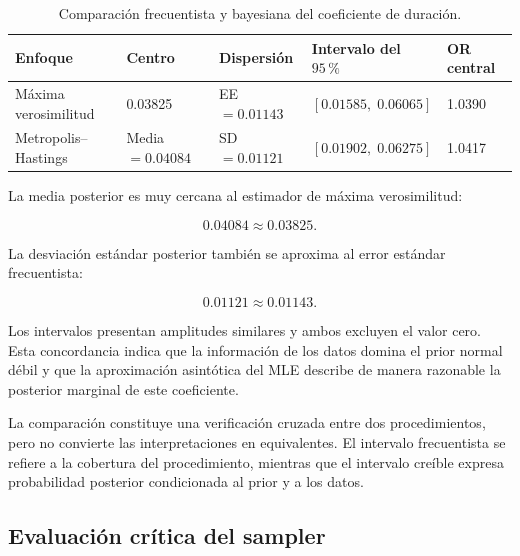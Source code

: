 \begin{table}[H]
    \centering
    \caption{Comparación frecuentista y bayesiana del coeficiente de
    duración.}
    \label{tab:comparacion-beta-duracion}

    \begin{tabularx}{0.94\textwidth}{
        @{}
        >{\raggedright\arraybackslash}p{3.3cm}
        >{\centering\arraybackslash}p{2.2cm}
        >{\centering\arraybackslash}p{2.2cm}
        >{\centering\arraybackslash}p{2.8cm}
        X
        @{}
    }
        \toprule
        Enfoque
        & Centro
        & Dispersión
        & Intervalo del \(95\,\%\)
        & OR central \\
        \midrule

        Máxima verosimilitud
        & \num{0.03825}
        & EE \(=\num{0.01143}\)
        & \([0.01585,\;0.06065]\)
        & \num{1.0390} \\

        Metropolis--Hastings
        & Media \(=\num{0.04084}\)
        & SD \(=\num{0.01121}\)
        & \([0.01902,\;0.06275]\)
        & \num{1.0417} \\

        \bottomrule
    \end{tabularx}
\end{table}

La media posterior es muy cercana al estimador de máxima verosimilitud:

\[
0.04084
\approx
0.03825.
\]

La desviación estándar posterior también se aproxima al error estándar
frecuentista:

\[
0.01121
\approx
0.01143.
\]

Los intervalos presentan amplitudes similares y ambos excluyen el valor
cero. Esta concordancia indica que la información de los datos domina el
prior normal débil y que la aproximación asintótica del MLE describe de
manera razonable la posterior marginal de este coeficiente.

La comparación constituye una verificación cruzada entre dos
procedimientos, pero no convierte las interpretaciones en equivalentes.
El intervalo frecuentista se refiere a la cobertura del procedimiento,
mientras que el intervalo creíble expresa probabilidad posterior
condicionada al prior y a los datos.

\subsection{Evaluación crítica del sampler}

